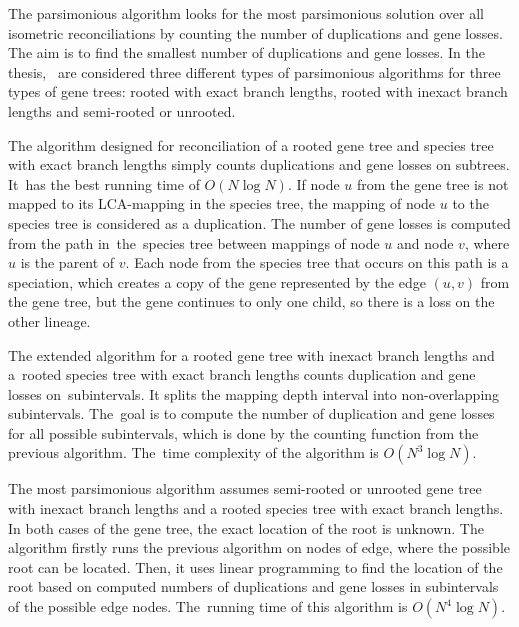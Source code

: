 The parsimonious algorithm looks for the most parsimonious solution over all isometric reconciliations by counting the number of duplications and gene losses. The aim is to find the smallest number of duplications and gene losses. In the thesis,~\cite{chladek_thesis} are considered three different types of parsimonious algorithms for three types of gene trees: rooted with exact branch lengths, rooted with inexact branch lengths and semi-rooted or unrooted.

The algorithm designed for reconciliation of a rooted gene tree and species tree with exact branch lengths simply counts duplications and gene losses on subtrees. It~has the best running time of $O(N \log N)$. If node $u$ from the gene tree is not mapped to its LCA-mapping in the species tree, the mapping of node $u$ to the species tree is considered as a duplication. The number of gene losses is computed from the path in~the~species tree between mappings of node $u$ and node $v$, where $u$ is the parent of $v$. Each node from the species tree that occurs on this path is a speciation, which creates a copy of the gene represented by the edge $(u, v)$ from the gene tree, but the gene continues to only one child, so there is a loss on the other lineage.

The extended algorithm for a rooted gene tree with inexact branch lengths and a~rooted species tree with exact branch lengths counts duplication and gene losses on~subintervals. It splits the mapping depth interval into non-overlapping subintervals. The~goal is to compute the number of duplication and gene losses for all possible subintervals, which is done by the counting function from the previous algorithm. The~time complexity of the algorithm is $O(N^3 \log N)$.

The most parsimonious algorithm assumes semi-rooted or unrooted gene tree with inexact branch lengths and a rooted species tree with exact branch lengths. In both cases of the gene tree, the exact location of the root is unknown. The algorithm firstly runs the previous algorithm on nodes of edge, where the possible root can be located. Then, it uses linear programming to find the location of the root based on computed numbers of duplications and gene losses in subintervals of the possible edge nodes. The~running time of this algorithm is $O(N^4 \log N)$.
